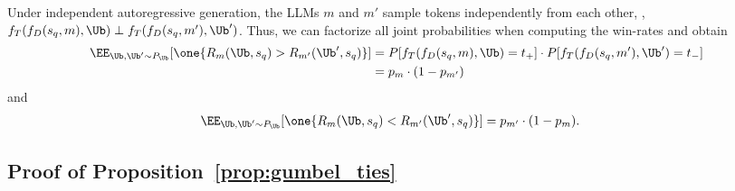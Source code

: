 %
Under independent autoregressive generation, the LLMs $m$ and $m'$ sample tokens independently from each other, \ie, $f_T(f_D(s_q, m),\Ub) \perp f_T(f_D(s_q, m'),\Ub')$. 
%
Thus, we can factorize all joint probabilities when computing the win-rates and obtain
%
\begin{align*}\nonumber
        \EE_{\Ub, \Ub'\sim P_{\Ub}} [\one\{R_m(\Ub,s_q)>R_{m'}(\Ub',s_q)\}] &=\PP[f_T(f_D(s_q, m),\Ub)= t_+] \cdot \PP[f_T(f_D(s_q, m'),\Ub')= t_-] \\ &=
        p_m \cdot (1-p_{m'})
\end{align*}
and
\begin{equation}\nonumber
    \begin{split}
        \EE_{\Ub, \Ub'\sim P_{\Ub}} & [\one\{R_m(\Ub,s_q)<R_{m'}(\Ub',s_q)\}] 
         = p_{m'} \cdot (1-p_m).
    \end{split}
\end{equation}


\subsection{Proof of Proposition~\ref{prop:gumbel_ties}}

